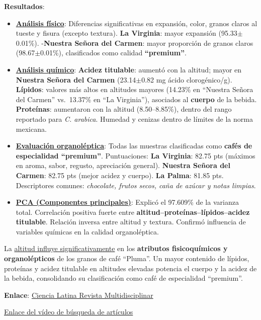 \documentclass{article}
\begin{document}
\textbf{Resultados}:  
\begin{itemize}
	\item \underline{\textbf{Análisis físico}}:  
	Diferencias significativas en expansión, color, granos claros al tueste y fisura (excepto textura).  
	\textbf{La Virginia}: mayor expansión (95.33$\pm$0.01\%).  
	-\textbf{Nuestra Señora del Carmen}: mayor proporción de granos claros (98.67$\pm$0.01\%), clasificados como calidad \textbf{``premium''}.
	
	\item \underline{\textbf{Análisis químico}}:  
	 \textbf{Acidez titulable}: aumentó con la altitud; mayor en \textbf{Nuestra Señora del Carmen} (23.14$\pm$0.82 mg ácido clorogénico/g).  
	 \textbf{Lípidos}: valores más altos en altitudes mayores (14.23\% en ``Nuestra Señora del Carmen'' vs.\ 13.37\% en ``La Virginia''), asociados al \textbf{cuerpo} de la bebida.  
	\textbf{Proteínas}: aumentaron con la altitud (8.50–8.85\%), dentro del rango reportado para \textit{C. arabica}.  
	 Humedad y cenizas dentro de límites de la norma mexicana.
	
	\item \underline{\textbf{Evaluación organoléptica}}:  
	Todas las muestras clasificadas como \textbf{cafés de especialidad ``premium''}.  
	Puntuaciones: \textbf{La Virginia}: 82.75 pts (máximos en aroma, sabor, regusto, apreciación general).  
	\textbf{Nuestra Señora del Carmen}: 82.75 pts (mejor acidez y cuerpo).  
	 \textbf{La Palma}: 81.85 pts.  
	Descriptores comunes: \textit{chocolate, frutos secos, caña de azúcar y notas limpias}.
	
	\item \underline{\textbf{PCA (Componentes principales)}}:  
	 Explicó el 97.609\% de la varianza total.  
	Correlación positiva fuerte entre \textbf{altitud–proteínas–lípidos–acidez titulable}.  
	Relación inversa entre altitud y textura.  
	Confirmó influencia de variables químicas en la calidad organoléptica.
\end{itemize} \vspace{0.3cm}

La \underline{altitud influye significativamente} en los \textbf{atributos fisicoquímicos y organolépticos} de los granos de café ``Pluma''. Un mayor contenido de lípidos, proteínas y acidez titulable en altitudes elevadas potencia el cuerpo y la acidez de la bebida, consolidando su clasificación como café de especialidad ``premium''. \vspace{0.5cm}

\textbf{Enlace}: \href{https://ciencialatina.org/index.php/cienciala/article/view/15987}{Ciencia Latina Revista Multidisciplinar} 


\href{https://drive.google.com/file/d/1hA02atl50Ln51g2URjeCjpUj-LieqEYm/view?usp=sharing}{Enlace del vídeo de búsqueda de artículos}
\end{document}
